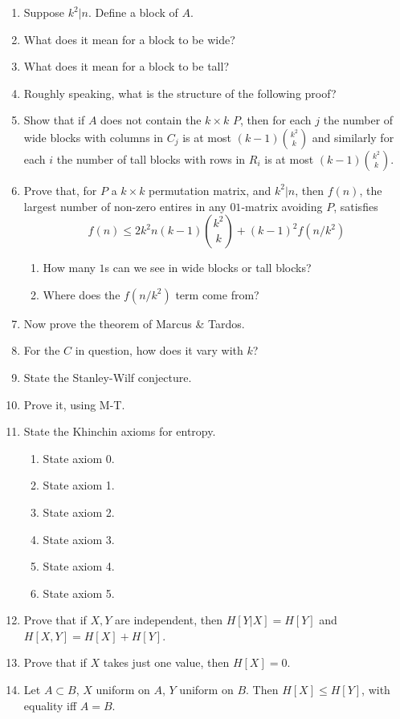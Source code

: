 \documentclass[10pt]{article}
\begin{document}
\begin{enumerate}
    \item Suppose $k^2 | n$. Define a block of $A$.
    \item What does it mean for a block to be wide?
    \item What does it mean for a block to be tall?
    \item Roughly speaking, what is the structure of the following proof?
    \item Show that if $A$ does not contain the $k\times k$ $P$, then for each $j$ the number of wide blocks with columns in $C_j$ is at most $(k-1){k^2\choose k}$ and similarly for each $i$ the number of tall blocks with rows in $R_i$ is at most $(k-1){k^2\choose k}$.
    \item Prove that, for $P$ a $k\times k$ permutation matrix, and $k^2 | n$, then $f(n)$, the largest number of non-zero entires in any $01$-matrix avoiding $P$, satisfies \[f(n) \le 2k^2 n(k-1){k^2\choose k}+(k-1)^2f(n/k^2)\]
    \begin{enumerate}
        \item How many $1$s can we see in wide blocks or tall blocks?
        \item Where does the $f(n/k^2)$ term come from?
    \end{enumerate}
    \item Now prove the theorem of Marcus \& Tardos.
    \item For the $C$ in question, how does it vary with $k$?
    \item State the Stanley-Wilf conjecture.
    \item Prove it, using M-T.
    \item State the Khinchin axioms for entropy.
    \begin{enumerate}
        \item State axiom 0.
        \item State axiom 1.
        \item State axiom 2.
        \item State axiom 3.
        \item State axiom 4.
        \item State axiom 5.
    \end{enumerate}
    \item Prove that if $X,Y$ are independent, then $H[Y|X] = H[Y]$ and $H[X,Y] = H[X] + H[Y]$.
    \item Prove that if $X$ takes just one value, then $H[X] = 0$.
    \item Let $A\subset B$, $X$ uniform on $A$, $Y$ uniform on $B$. Then $H[X]\le H[Y]$, with equality iff $A = B$.

\end{enumerate}
\end{document}
